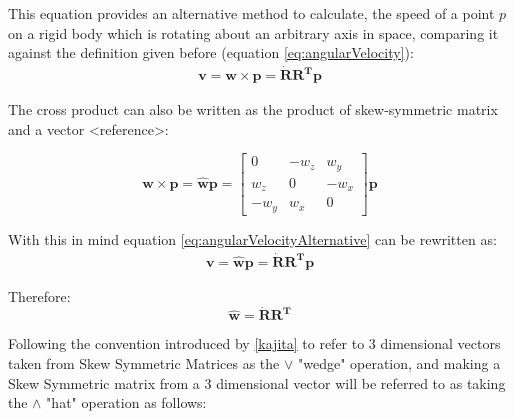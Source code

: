\documentclass[a4paper]{report}
\begin{document}
This equation provides an alternative method to calculate, the speed of a point $p$
on a rigid body which is rotating about an arbitrary axis in space, comparing it
against the definition given before (equation \eqref{eq:angularVelocity}):
\begin{equation}
\begin{split}
    \boldsymbol{v} = \boldsymbol{w} \times \boldsymbol{p} = \boldsymbol{\dot{R}} \boldsymbol{R^{T}} \boldsymbol{p} \label{eq:angularVelocityAlternative}
\end{split}
\end{equation}

The cross product can also be written as the product of skew-symmetric matrix and a vector <reference>:

\begin{equation}
    \boldsymbol{w} \times \boldsymbol{p} = \hat{\boldsymbol{w}} \boldsymbol{p} =
    \begin{bmatrix}
        0 & -w_z & w_y \\
        w_z & 0 & -w_x \\
        -w_y & w_x & 0
    \end{bmatrix} \boldsymbol{p}
\end{equation}

With this in mind equation \eqref{eq:angularVelocityAlternative} can be rewritten as:
\begin{equation}
\begin{split}
    \boldsymbol{v} = \hat{\boldsymbol{w}} \boldsymbol{p} = \boldsymbol{\dot{R}} \boldsymbol{R^{T}} \boldsymbol{p}
\end{split}
\end{equation}

Therefore:
\begin{equation}
    \hat{\boldsymbol{w}} = \boldsymbol{\dot{R}} \boldsymbol{R^{T}} \label{eq:hatAngularVelocity}
\end{equation}

Following the convention introduced by \ref{kajita} to refer to 3 dimensional vectors
taken from Skew Symmetric Matrices as the $\vee$ "wedge" operation, and making a Skew
Symmetric matrix from a 3 dimensional vector will be referred to as taking the
$\wedge$ "hat" operation as follows:
\end{document}
